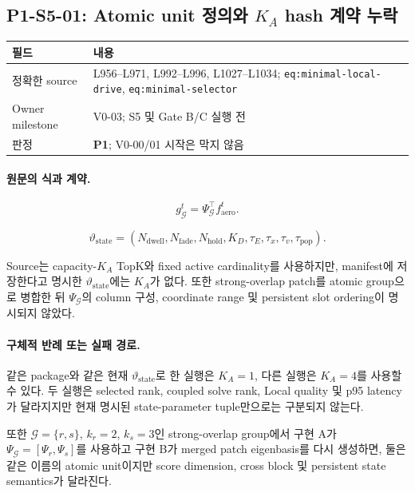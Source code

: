 \documentclass[11pt]{article}
\newcommand{\src}[1]{\textcolor{CoreBlue}{\nolinkurl{#1}}}
\newcommand{\pone}{\textcolor{WarnOrange}{\textbf{P1}}}
\begin{document}
\subsection{P1-S5-01: Atomic unit 정의와 $K_A$ hash 계약 누락}

\begin{tabularx}{\textwidth}{L{0.22\textwidth}Y}
\toprule
필드 & 내용 \\
\midrule
정확한 source & L956--L971, L992--L996, L1027--L1034; \src{eq:minimal-local-drive}, \src{eq:minimal-selector} \\
Owner milestone & V0-03; S5 및 Gate B/C 실행 전 \\
판정 & \pone; V0-00/01 시작은 막지 않음 \\
\bottomrule
\end{tabularx}

\paragraph{원문의 식과 계약.}
\begin{equation}
  g_{\mathcal G}^t
  =
  \Psi_{\mathcal G}^\top f_{\mathrm{aero}}^t.
  \tag{source: eq:minimal-local-drive}
\end{equation}

\begin{equation}
  \vartheta_{\mathrm{state}}
  =
  \left(
  N_{\mathrm{dwell}},N_{\mathrm{fade}},N_{\mathrm{hold}},K_D,
  \tau_E,\tau_x,\tau_v,\tau_{\mathrm{pop}}
  \right).
  \tag{source: L1027--L1034}
\end{equation}

Source는 capacity-$K_A$ TopK와 fixed active cardinality를 사용하지만,
manifest에 저장한다고 명시한 $\vartheta_{\mathrm{state}}$에는 $K_A$가 없다.
또한 strong-overlap patch를 atomic group으로 병합한 뒤 $\Psi_{\mathcal G}$의 column 구성,
coordinate range 및 persistent slot ordering이 명시되지 않았다.

\paragraph{구체적 반례 또는 실패 경로.}
같은 package와 같은 현재 $\vartheta_{\mathrm{state}}$로 한 실행은 $K_A=1$,
다른 실행은 $K_A=4$를 사용할 수 있다. 두 실행은 selected rank, coupled solve rank,
Local quality 및 p95 latency가 달라지지만 현재 명시된 state-parameter tuple만으로는 구분되지 않는다.

또한 $\mathcal G=\{r,s\}$, $k_r=2$, $k_s=3$인 strong-overlap group에서 구현 A가
$\Psi_{\mathcal G}=[\Psi_r,\Psi_s]$를 사용하고 구현 B가 merged patch eigenbasis를 다시 생성하면,
둘은 같은 이름의 atomic unit이지만 score dimension, cross block 및 persistent state semantics가 달라진다.
\end{document}
